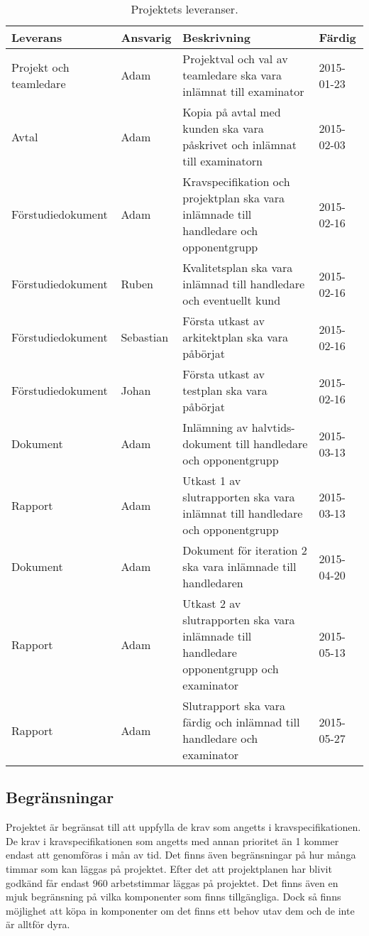 \begin{table}[H]
  \centering
    \begin{tabularx}{\textwidth}{| X | l | X | l |}
      \hline
      \textbf{Leverans} & \textbf{Ansvarig} & \textbf{Beskrivning} & \textbf{Färdig} \\
      \hline

      {Projekt och teamledare} & {Adam} & {Projektval och val av teamledare ska vara inlämnat till examinator} & {2015-01-23} \\
            \hline
      {Avtal} & {Adam} & {Kopia på avtal med kunden ska vara påskrivet och inlämnat till examinatorn} & {2015-02-03} \\
      \hline
      {Förstudiedokument} & {Adam} & {Kravspecifikation och projektplan ska vara inlämnade till handledare och opponentgrupp} & {2015-02-16} \\
      \hline
      {Förstudiedokument} & {Ruben} & {Kvalitetsplan ska vara inlämnad till handledare och eventuellt kund} & {2015-02-16} \\
      \hline
      {Förstudiedokument} & {Sebastian} & {Första utkast av arkitektplan ska vara påbörjat} & {2015-02-16} \\
      \hline
      {Förstudiedokument} & {Johan} & {Första utkast av testplan ska vara påbörjat} & {2015-02-16} \\
      \hline
      {Dokument} & {Adam} & {Inlämning av halvtids-dokument till handledare och opponentgrupp} & {2015-03-13} \\
      \hline
      {Rapport} & {Adam} & {Utkast 1 av slutrapporten ska vara inlämnat till handledare och opponentgrupp} & {2015-03-13} \\
      \hline
      {Dokument} & {Adam} & {Dokument för iteration 2 ska vara inlämnade till handledaren} & {2015-04-20} \\
      \hline
      {Rapport} & {Adam} & {Utkast 2 av slutrapporten ska vara inlämnade till handledare opponentgrupp och examinator} & {2015-05-13} \\
      \hline
      {Rapport} & {Adam} & {Slutrapport ska vara färdig och inlämnad till handledare och examinator} & {2015-05-27} \\
      \hline

    \end{tabularx}
  \caption{Projektets leveranser.} \label{dokumentation:tabell}
\end{table}


\subsection{Begränsningar}

Projektet är begränsat till att uppfylla de krav som angetts i kravspecifikationen. De krav i kravspecifikationen som angetts med annan prioritet än 1 kommer endast att genomföras i mån av tid. Det finns även begränsningar på hur många timmar som kan läggas på projektet. Efter det att projektplanen har blivit godkänd får endast 960 arbetstimmar läggas på projektet. Det finns även en mjuk begränsning på vilka komponenter som finns tillgängliga. Dock så finns möjlighet att köpa in komponenter om det finns ett behov utav dem och de inte är alltför dyra.
